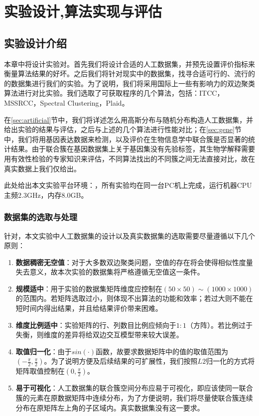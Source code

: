 
\chapter{实验设计,算法实现与评估}
\label{chapter:experiment}
\section{实验设计介绍}
\label{sec:experiment}
本章中将设计实验对。首先我们将设计合适的人工数据集，并预先设置评价指标来衡量算法结果的好坏。之后我们将针对现实中的数据集，找寻合适可行的、流行的的数据集进行我们的实验。为了说明，我们将采用国际上一些有影响力的双边聚类算法进行对比实验。我们选取了可获取程序的几个算法，包括：ITCC，MSSRCC，Spectral Clustering，Plaid。

在\ref{sec:artificial}节中，我们将详述怎么用高斯分布与随机分布构造人工数据集，并给出实验的结果与评估，之后与上述的几个算法进行性能对比；在\ref{sec:gene}节中，我们将用基因表达数据来检测，以及评价在生物信息学中联合簇是否显著的统计结果。由于联合簇在基因数据集上关于基因集没有先验标签，其生物学解释需要用有效性检验的专家知识来评估，不同算法找出的不同簇之间无法直接对比，故在真实数据上我们仅给出。

此处给出本文实验平台环境：，所有实验均在同一台PC机上完成，运行机器CPU主频2.3GHz，内存8.0GB。

\subsection{数据集的选取与处理}
\label{subsec:principle}
针对，本文实验中人工数据集的设计以及真实数据集的选取需要尽量遵循以下几个原则：
\begin{enumerate}
\item \textbf{数据稠密无空值}：对于大多数双边聚类问题，空值的存在将会使得相似性度量失去意义，故本次实验的数据集将严格遵循无空值这一条件。
\item \textbf{规模适中}：用于实验的数据集矩阵维度应控制在$(50\times50)\sim(1000\times1000)$的范围内。若矩阵选取过小，则体现不出算法的功能和效率；若过大则不能在短时间内得出结果，并且给结果评价带来困难。
\item \textbf{维度比例适中}：实验矩阵的行、列数目比例应倾向于$1:1$（方阵）。若比例过于失衡，则维度的差异将给双边交互模型带来较大误差。
\item \textbf{取值归一化}：由于$sin(\cdot)$函数，故要求数据矩阵中的值的取值范围为$(-\frac{\pi}{2},\frac{\pi}{2})$。为了说明方便及后续结果的可扩展性，我们按照$L2$归一化的方式将矩阵取值控制在$(0,\frac{\pi}{2})$。
\item \textbf{易于可视化}：人工数据集的联合簇空间分布应易于可视化，即应该使同一联合簇的元素在原数据矩阵中连续分布，为了方便说明，我们将尽量使联合簇连续分布在原矩阵左上角的子区域内。真实数据集没有这一要求。
\end{enumerate}


